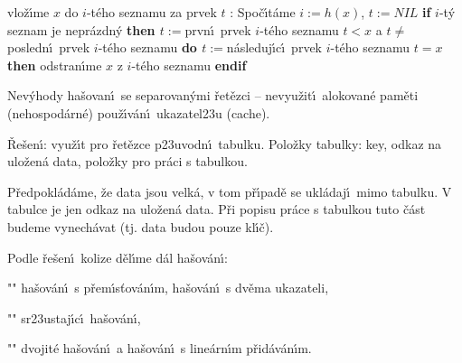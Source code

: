 \phantom{---}{\bf else\newline} 
\phantom{------}vlo\v z\'\i me $x$ do $i$-t\'eho seznamu za prvek $
t$\newline 
\phantom{---}{\bf endif\newline 
endif
\medskip

\flushpar DELETE$(x)$}:\newline 
Spo\v c\'\i t\'ame $i:=h(x)$, $t:=NIL$
{\bf if} $i$-t\'y seznam je nepr\'azdn\'y {\bf then\newline 
\phantom{{\rm ---}}$t:=$}prvn\'\i\ prvek $i$-t\'eho seznamu\newline 
\phantom{---}{\bf while} $t<x$ a $t\ne$posledn\'\i\ prvek $i$-t\'eho seznamu {\bf do\newline 
\phantom{{\rm ------}}$t:=$}n\'asleduj\'\i c\'\i\ prvek $i$-t\'eho seznamu\newline 
\phantom{---}{\bf enddo\newline 
endif\newline 
if} $t=x$ {\bf then} odstran\'\i me $x$ z $i$-t\'eho seznamu {\bf endif}
\bigskip

\flushpar Nev\'yhody ha\v sovan\'\i\ se separovan\'ymi \v ret\v ezci --\newline 
\phantom{---}nevyu\v zit\'\i\ alokovan\'e pam\v eti (nehospod\'arn\'e)\newline 
\phantom{---}pou\v z\'\i v\'an\'\i\ ukazatel\accent23u (cache).\newline 

\flushpar\v Re\v sen\'\i : vyu\v z\'\i t pro \v ret\v ezce p\accent23uvodn\'\i\ tabulku. 
\medskip
\flushpar Polo\v zky tabulky:\newline 
\phantom{---}key,\newline 
\phantom{---}odkaz na ulo\v zen\'a data,\newline 
\phantom{---}polo\v zky pro pr\'aci s tabulkou.
\medskip

\flushpar P\v redpokl\'ad\'ame, \v ze data jsou velk\'a, v tom p\v r\'\i pad\v e se 
ukl\'adaj\'\i\ mimo tabulku. V tabulce je jen odkaz na ulo\v zen\'a data. 
P\v ri popisu pr\'ace s tabulkou tuto \v c\'ast budeme vynech\'avat (tj. 
data budou pouze kl\'\i\v c).
\medskip

\flushpar Podle \v re\v sen\'\i\ kolize d\v el\'\i me d\'al ha\v sov\'an\'\i :
\roster
\item"{}"
ha\v sov\'an\'\i\ s p\v rem\'\i s\v tov\'an\'\i m, ha\v sov\'an\'\i\ s dv\v ema 
ukazateli, 
\item"{}"
sr\accent23ustaj\'\i c\'\i\ ha\v sov\'an\'\i,
\item"{}"
dvojit\'e ha\v sov\'an\'\i\ a ha\v sov\'an\'\i\ s line\'arn\'\i m 
p\v rid\'av\'an\'\i m.
\endroster 

